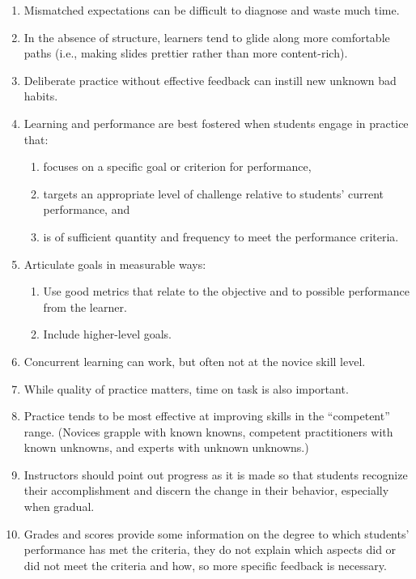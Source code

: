 \begin{enumerate}
\def\labelenumi{\arabic{enumi}.}
\itemsep1pt\parskip0pt
\item
  Mismatched expectations can be difficult to diagnose and waste much
  time.
\item
  In the absence of structure, learners tend to glide along more
  comfortable paths (i.e., making slides prettier rather than more
  content-rich).
\item
  Deliberate practice without effective feedback can instill new unknown
  bad habits.
\item
  Learning and performance are best fostered when students engage in
  practice that:

  \begin{enumerate}
  \def\labelenumii{\arabic{enumii}.}
  \itemsep1pt\parskip0pt
  \item
    focuses on a specific goal or criterion for performance,
  \item
    targets an appropriate level of challenge relative to students'
    current performance, and
  \item
    is of sufficient quantity and frequency to meet the performance
    criteria.
  \end{enumerate}
\item
  Articulate goals in measurable ways:

  \begin{enumerate}
  \def\labelenumii{\arabic{enumii}.}
  \itemsep1pt\parskip0pt
  \item
    Use good metrics that relate to the objective and to possible
    performance from the learner.
  \item
    Include higher-level goals.
  \end{enumerate}
\item
  Concurrent learning can work, but often not at the novice skill level.
\item
  While quality of practice matters, time on task is also important.
\item
  Practice tends to be most effective at improving skills in the
  ``competent'' range. (Novices grapple with known knowns, competent
  practitioners with known unknowns, and experts with unknown unknowns.)
\item
  Instructors should point out progress as it is made so that students
  recognize their accomplishment and discern the change in their
  behavior, especially when gradual.
\item
  Grades and scores provide some information on the degree to which
  students' performance has met the criteria, they do not explain which
  aspects did or did not meet the criteria and how, so more specific
  feedback is necessary.
\end{enumerate}


